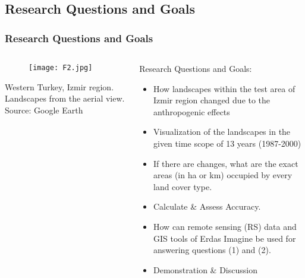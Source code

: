 \documentclass[pdflatex,compress,8pt,
	xcolor={dvipsnames,dvipsnames,svgnames,x11names,table},
	hyperref={
	breaklinks = true, 
	pdfauthor={Lemenkova Polina}, 
	pdfsubject={Preentation}, 
	pdfcreator={Lemenkova Polina}, 
	pdfproducer={Lemenkova Polina}, 
	citecolor=NavyBlue, 
	urlbordercolor=cyan,
	urlcolor = NavyBlue, 
	breaklinks = true}]{beamer}
\begin{document}
\subsection{Research Questions and Goals}
\begin{frame}\frametitle{Research Questions and Goals}
\begin{minipage}[0.4\textheight]{\textwidth}
\begin{columns}[T]
\begin{column}{0.5\textwidth}
\vspace{2em}
\begin{figure}[H]
	\centering
		\texttt{[image: F2.jpg]}
\end{figure}
\footnotesize{Western Turkey, Izmir region. Landscapes from the aerial view. Source: Google Earth}
\end{column}
\begin{column}{0.5\textwidth}
\vspace{2em} 
Research Questions and Goals: 
\begin{itemize}
	\item How landscapes within the test area of Izmir region changed due to the anthropogenic effects 
	\item Visualization of the landscapes in the given time scope of 13 years (1987-2000)
	\item If there are changes, what are the exact areas (in ha or km) occupied by every land cover type.
	\item Calculate \& Assess Accuracy.
	\item How can remote sensing (RS) data and GIS tools of Erdas Imagine be used for answering questions (1) and (2). 
	\item Demonstration \& Discussion
\end{itemize}
\end{column}
\end{columns}
\end{minipage}
\end{frame}
\end{document}
